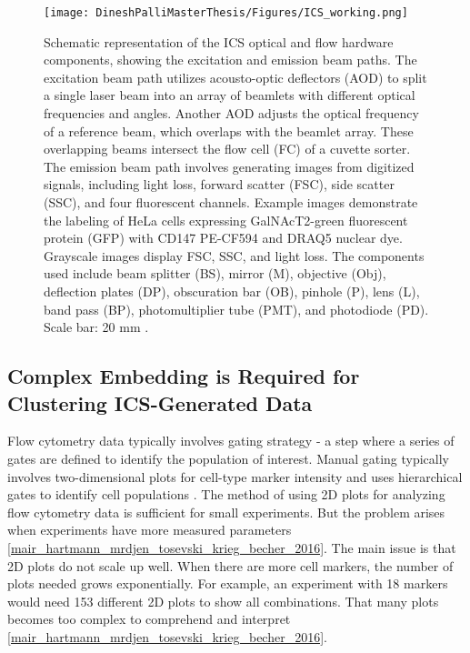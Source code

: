 \documentclass[12pt,a4paper]{article}
\begin{document}
\begin{figure}
  \centering
  \texttt{[image: DineshPalliMasterThesis/Figures/ICS\_working.png]}
  \caption[Representation of Image-based Cell Sorter]{Schematic representation of the ICS optical and flow hardware components, showing the excitation and emission beam paths. The excitation beam path utilizes acousto-optic deflectors (AOD) to split a single laser beam into an array of beamlets with different optical frequencies and angles. Another AOD adjusts the optical frequency of a reference beam, which overlaps with the beamlet array. These overlapping beams intersect the flow cell (FC) of a cuvette sorter. The emission beam path involves generating images from digitized signals, including light loss, forward scatter (FSC), side scatter (SSC), and four fluorescent channels. Example images demonstrate the labeling of HeLa cells expressing GalNAcT2-green fluorescent protein (GFP) with CD147 PE-CF594 and DRAQ5 nuclear dye. Grayscale images display FSC, SSC, and light loss. The components used include beam splitter (BS), mirror (M), objective (Obj), deflection plates (DP), obscuration bar (OB), pinhole (P), lens (L), band pass (BP), photomultiplier tube (PMT), and photodiode (PD). Scale bar: 20 mm \cite{doi:10.1126/science.abj3013}.}
  \label{icsworking}
\end{figure}



\subsection{Complex Embedding is Required for Clustering ICS-Generated Data}
Flow cytometry data typically involves gating strategy - a step where a series of gates are defined to identify the population of interest. Manual gating typically involves two-dimensional plots for cell-type marker intensity and uses hierarchical gates to identify cell populations \cite{10.3389/fimmu.2021.787574}. The method of using 2D plots for analyzing flow cytometry data is sufficient for small experiments. But the problem arises when experiments have more measured parameters \ref{mair_hartmann_mrdjen_tosevski_krieg_becher_2016}. The main issue is that 2D plots do not scale up well. When there are more cell markers, the number of plots needed grows exponentially. For example, an experiment with 18 markers would need 153 different 2D plots to show all combinations. That many plots becomes too complex to comprehend and interpret \ref{mair_hartmann_mrdjen_tosevski_krieg_becher_2016}.
\end{document}
